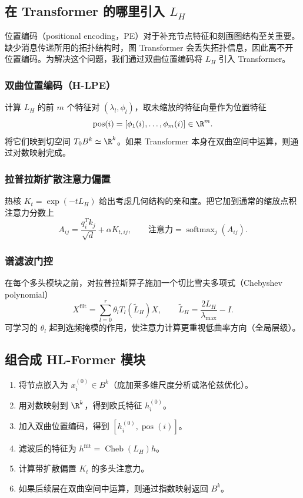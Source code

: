 \subsection{在 Transformer 的哪里引入 \texorpdfstring{$L_H$}{LH}}
位置编码（positional encoding，PE）对于补充节点特征和刻画图结构至关重要。缺少消息传递所用的拓扑结构时，图 Transformer 会丢失拓扑信息，因此离不开位置编码。为解决这个问题，我们通过双曲位置编码将 $L_H$ 引入 Transformer。

\subsubsection{双曲位置编码（H-LPE）}
计算 $L_H$ 的前 $m$ 个特征对 $(\lambda_l,\phi_l)$，取未缩放的特征向量作为位置特征
\[
  \operatorname{pos}(i)=[\phi_1(i),\dots,\phi_m(i)]\in\R^m.
\]
将它们映到切空间 $T_0B^k\simeq\R^k$。如果 Transformer 本身在双曲空间中运算，则通过对数映射完成。

\subsubsection{拉普拉斯扩散注意力偏置}
热核 $K_t=\exp(-tL_H)$ 给出考虑几何结构的亲和度。把它加到通常的缩放点积注意力分数上
\[
  A_{ij}=\frac{q_i^Tk_j}{\sqrt d}+\alpha K_{t,ij},\qquad
  \text{注意力}=\operatorname{softmax}_j(A_{ij}).
\]

\subsubsection{谱滤波门控}
在每个多头模块之前，对拉普拉斯算子施加一个切比雪夫多项式（Chebyshev polynomial）
\[
  X^{\mathrm{filt}}=\sum_{l=0}^{r}\theta_lT_l(\widetilde L_H)X,\qquad
  \widetilde L_H=\frac{2L_H}{\lambda_{\max}}-I.
\]
可学习的 $\theta_l$ 起到选频掩模的作用，使注意力计算更重视低曲率方向（全局层级）。

\subsection{组合成 HL-Former 模块}
\begin{enumerate}
\item 将节点嵌入为 $x_i^{(0)}\in B^k$（庞加莱多维尺度分析或洛伦兹优化）。
\item 用对数映射到 $\R^k$，得到欧氏特征 $h_i^{(0)}$。
\item 加入双曲位置编码，得到 $[h_i^{(0)},\operatorname{pos}(i)]$。
\item 滤波后的特征为 $h^{\mathrm{filt}}=\operatorname{Cheb}(L_H)h$。
\item 计算带扩散偏置 $K_t$ 的多头注意力。
\item 如果后续层在双曲空间中运算，则通过指数映射返回 $B^k$。
\end{enumerate}

